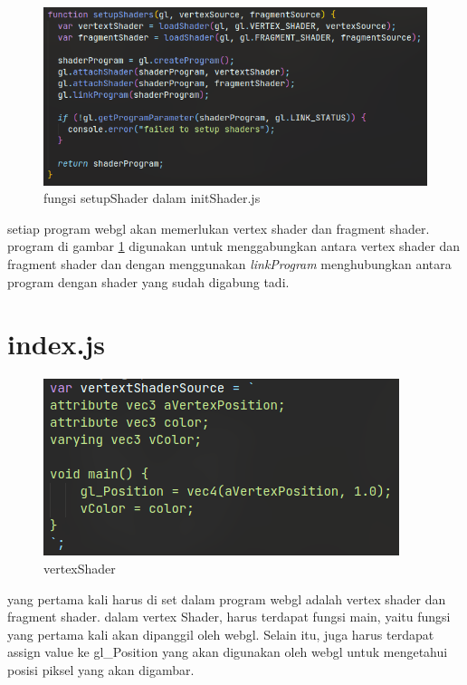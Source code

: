 \begin{figure}[h]
    \includegraphics[width=\textwidth]{grafika/setupShader.png}
    \caption{fungsi setupShader dalam initShader.js}
    \label{fig: setupShader}
\end{figure}

setiap program webgl akan memerlukan vertex shader dan fragment shader.
program di gambar \ref{fig: setupShader} digunakan untuk menggabungkan
antara vertex shader dan fragment shader dan dengan menggunakan \emph{linkProgram} menghubungkan antara program
dengan shader yang sudah digabung tadi.



\section{index.js}

\begin{figure}[h]
    \centering
    \includegraphics{grafika/vertexShader.png}
    \caption{vertexShader}
    \label{fig: vertexShader}
\end{figure}

yang pertama kali harus di set dalam program webgl adalah vertex shader dan fragment shader.
dalam vertex Shader, harus terdapat fungsi main, yaitu fungsi yang pertama kali akan dipanggil
oleh webgl. Selain itu, juga harus terdapat assign value ke gl\_Position yang akan digunakan oleh
webgl untuk mengetahui posisi piksel yang akan digambar.

